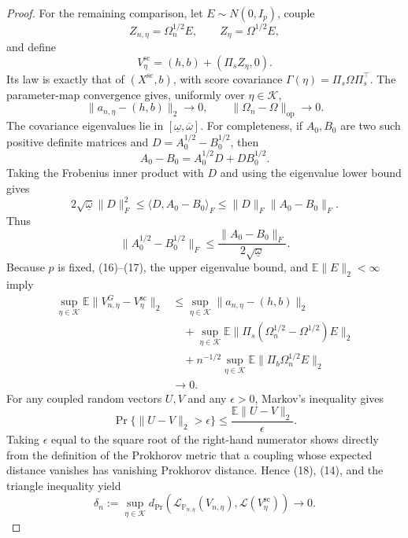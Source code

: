 \documentclass{article}
\begin{document}
\begin{proof}
For the remaining comparison, let \(E\sim N(0,I_p)\), couple
\[
 Z_{n,\eta}=\Omega_n^{1/2}E,
 \qquad
 Z_\eta=\Omega^{1/2}E,
\]
and define
\[
 V^{\mathrm{sc}}_\eta
 =(h,b)+(\Pi_sZ_\eta,0).
 \tag{15}
\]
Its law is exactly that of \((X^{\mathrm{sc}},b)\), with score covariance \(\Gamma(\eta)=\Pi_s\Omega\Pi_s^{\top}\). The parameter-map convergence gives, uniformly over \(\eta\in\mathcal K\),
\[
 \lVert a_{n,\eta}-(h,b)\rVert_2\longrightarrow0,
 \qquad
 \lVert\Omega_n-\Omega\rVert_{\mathrm{op}}\longrightarrow0.
 \tag{16}
\]
The covariance eigenvalues lie in \([\underline\omega,\overline\omega]\). For completeness, if \(A_0,B_0\) are two such positive definite matrices and \(D=A_0^{1/2}-B_0^{1/2}\), then
\[
 A_0-B_0=A_0^{1/2}D+DB_0^{1/2}.
\]
Taking the Frobenius inner product with \(D\) and using the eigenvalue lower bound gives
\[
 2\sqrt{\underline\omega}\lVert D\rVert_F^2
 \leq\langle D,A_0-B_0\rangle_F
 \leq\lVert D\rVert_F\lVert A_0-B_0\rVert_F.
\]
Thus
\[
 \lVert A_0^{1/2}-B_0^{1/2}\rVert_F
 \leq\frac{\lVert A_0-B_0\rVert_F}{2\sqrt{\underline\omega}}.
 \tag{17}
\]
Because \(p\) is fixed, (16)--(17), the upper eigenvalue bound, and \(\mathbb E\lVert E\rVert_2<\infty\) imply
\[
 \begin{aligned}
 \sup_{\eta\in\mathcal K}
 \mathbb E\lVert V^G_{n,\eta}-V^{\mathrm{sc}}_\eta\rVert_2
 &\leq
 \sup_{\eta\in\mathcal K}\lVert a_{n,\eta}-(h,b)\rVert_2\\
 &\quad+
 \sup_{\eta\in\mathcal K}
 \mathbb E\lVert\Pi_s(\Omega_n^{1/2}-\Omega^{1/2})E\rVert_2\\
 &\quad+
 n^{-1/2}\sup_{\eta\in\mathcal K}
 \mathbb E\lVert\Pi_b\Omega_n^{1/2}E\rVert_2\\
 &\longrightarrow0.
 \end{aligned}
 \tag{18}
\]
For any coupled random vectors \(U,V\) and any \(\epsilon>0\), Markov's inequality gives
\[
 \Pr\{\lVert U-V\rVert_2>\epsilon\}
 \leq\frac{\mathbb E\lVert U-V\rVert_2}{\epsilon}.
\]
Taking \(\epsilon\) equal to the square root of the right-hand numerator shows directly from the definition of the Prokhorov metric that a coupling whose expected distance vanishes has vanishing Prokhorov distance. Hence (18), (14), and the triangle inequality yield
\[
 \delta_n:=
 \sup_{\eta\in\mathcal K}
 d_{\mathrm{Pr}}\!\left(
  \mathcal L_{\mathbb P_{n,\eta}}(V_{n,\eta}),
  \mathcal L(V^{\mathrm{sc}}_\eta)
 \right)
 \longrightarrow0.
 \tag{19}
\]


\end{proof}
\end{document}
